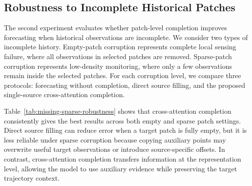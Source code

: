 \subsection{Robustness to Incomplete Historical Patches}
\label{subsec:missing-sparse-robustness}

The second experiment evaluates whether patch-level completion improves forecasting when historical observations are incomplete. We consider two types of incomplete history. Empty-patch corruption represents complete local sensing failure, where all observations in selected patches are removed. Sparse-patch corruption represents low-density monitoring, where only a few observations remain inside the selected patches. For each corruption level, we compare three protocols: forecasting without completion, direct source filling, and the proposed single-source cross-attention completion.

Table~\ref{tab:missing-sparse-robustness} shows that cross-attention completion consistently gives the best results across both empty and sparse patch settings. Direct source filling can reduce error when a target patch is fully empty, but it is less reliable under sparse corruption because copying auxiliary points may overwrite useful target observations or introduce source-specific offsets. In contrast, cross-attention completion transfers information at the representation level, allowing the model to use auxiliary evidence while preserving the target trajectory context.

